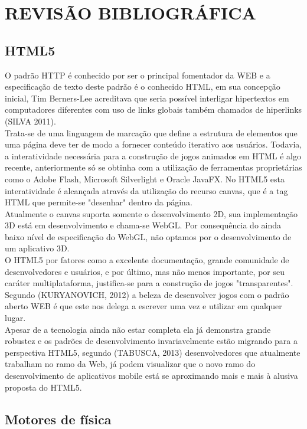 \documentclass{article}
\begin{document}
\section{REVISÃO BIBLIOGRÁFICA}
\subsection{HTML5}
O padrão HTTP é conhecido por ser o principal fomentador da WEB e a especificação de texto deste padrão é o conhecido HTML, em sua concepção inicial, Tim Berners-Lee acreditava que seria possível  interligar hipertextos em computadores diferentes com uso de links globais também chamados de hiperlinks (SILVA 2011).
\\
	Trata-se de uma linguagem de marcação que define a estrutura de elementos que uma página deve ter de modo a fornecer conteúdo iterativo aos usuários. Todavia, a interatividade necessária para a construção de jogos animados em HTML é algo recente, anteriormente só se obtinha com a utilização de ferramentas proprietárias como o Adobe Flash, Microsoft Silverlight e Oracle JavaFX. No HTML5 esta interatividade é alcançada através da utilização do recurso canvas, que é a tag HTML que permite-se "desenhar" dentro da página.
\\
	Atualmente o canvas suporta somente o desenvolvimento 2D, sua implementação 3D está em desenvolvimento e chama-se WebGL. Por consequência do ainda baixo nível de especificação do WebGL, não optamos por o desenvolvimento de um aplicativo 3D.
\\
	O HTML5 por fatores como a excelente documentação, grande comunidade de desenvolvedores e usuários, e por último, mas não menos importante, por seu caráter multiplataforma, justifica-se para a construção de jogos "transparentes". Segundo (KURYANOVICH, 2012) a beleza de desenvolver jogos com o padrão aberto WEB é que este nos delega a escrever uma vez e utilizar em qualquer lugar.
\\

	Apesar de a tecnologia  ainda não estar completa ela já demonstra grande robustez  e os padrões de desenvolvimento invariavelmente estão migrando para a perspectiva HTML5, segundo (TABUSCA, 2013) desenvolvedores que atualmente trabalham no ramo da Web, já podem visualizar que o novo ramo do desenvolvimento de aplicativos mobile está se aproximando mais e mais à alusiva proposta do HTML5. \subsection{Motores de física}
\\
\end{document}
